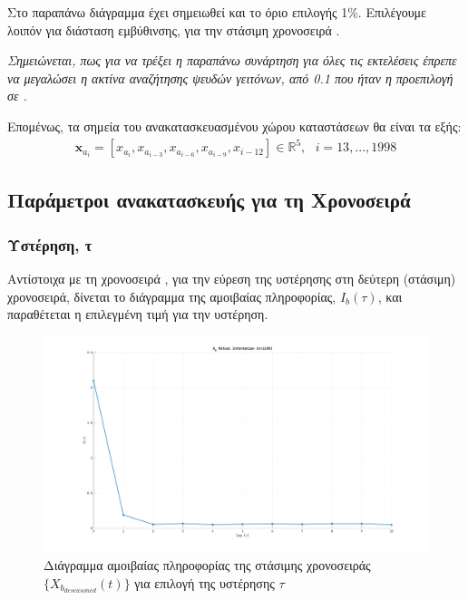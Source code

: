 Στο παραπάνω διάγραμμα έχει σημειωθεί και το όριο επιλογής 1\%. Επιλέγουμε λοιπόν για διάσταση εμβύθινσης, \textbf{} για την στάσιμη χρονοσειρά . 

\par \textit{Σημειώνεται, πως για να τρέξει η παραπάνω συνάρτηση για όλες τις εκτελέσεις έπρεπε να μεγαλώσει η ακτίνα αναζήτησης ψευδών γειτόνων, από 0.1 που ήταν η προεπιλογή σε \texttt{}.}

\par Επομένως, τα σημεία του ανακατασκευασμένου χώρου καταστάσεων θα είναι τα εξής:
\begin{align}
    \mathbf{x}_{a_i} = \left[x_{a_i}, x_{a_{i-3}}, x_{a_{i-6}}, x_{a_{i-9}}, x_{i-12}\right] \in \mathbb{R}^5, \ \ \ i=13,...,1998
\end{align}

\subsection{Παράμετροι ανακατασκευής για τη Χρονοσειρά }

\subsubsection{Υστέρηση, τ}

Αντίστοιχα με τη χρονοσειρά , για την εύρεση της υστέρησης στη δεύτερη (στάσιμη) χρονοσειρά, δίνεται το διάγραμμα της αμοιβαίας πληροφορίας, $I_b(\tau)$, και παραθέτεται η επιλεγμένη τιμή για την υστέρηση.

\begin{figure}[H]
    \begin{center}
        \includegraphics[width=\textwidth]{assets/images/plots/mutual_information_b.svg.pdf}
        \caption{Διάγραμμα αμοιβαίας πληροφορίας της στάσιμης χρονοσειράς $\{X_{b_{deseasoned}}(t)\}$ για επιλογή της υστέρησης $\tau$}
        \label{fig:mutual_information_b}
    \end{center}
\end{figure}

